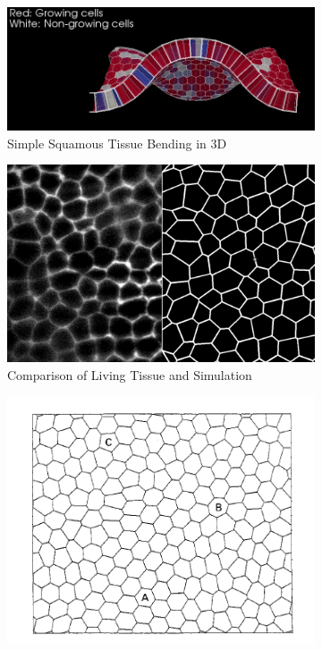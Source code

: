 \begin{figure}[h]
    \centering
    \begin{subfigure}[b]{0.4\textwidth}
		\centering
		\includegraphics[width=\textwidth]{../diagrams/okuda1.png}
		\caption{Simple Squamous Tissue Bending in 3D\cite{Okuda1}}
		\label{fig:okuda1}
    \end{subfigure}
    \hfill
    \begin{subfigure}[b]{0.4\textwidth}
		\centering
		\includegraphics[width=\textwidth]{../diagrams/perfect.png}
		\caption{Comparison of Living Tissue and Simulation\cite{Yoshi}}
		\label{fig:yoshi}
    \end{subfigure}
    \hfill
    \begin{subfigure}[b]{0.4\textwidth}
        \centering
        \includegraphics[width=\textwidth]{../diagrams/HondaResult.png}

\end{subfigure}
\end{figure}
